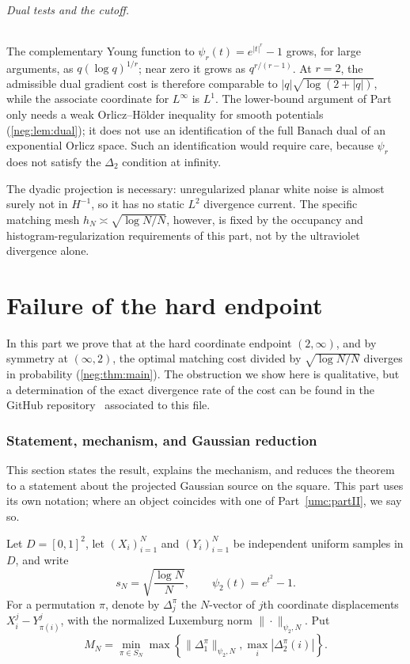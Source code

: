 \documentclass[11pt]{article}
\theoremstyle{definition}
\theoremstyle{remark}
\numberwithin{equation}{section}
\begin{document}
\paragraph{Dual tests and the cutoff.}
The complementary Young function to $\psi_r(t)=e^{|t|^r}-1$ grows,
for large arguments, as $q(\log q)^{1/r}$; near zero it grows as
$q^{r/(r-1)}$. At $r=2$, the admissible dual gradient cost is therefore
comparable to $|q|\sqrt{\log(2+|q|)}$, while the associate coordinate
for $L^\infty$ is $L^1$. The lower-bound argument of Part~\ref{umc:partIII}
only needs a weak Orlicz--H\"older inequality for smooth potentials
(\cref{neg:lem:dual}); it does not use an identification of the full
Banach dual of an exponential Orlicz space. Such an identification would
require care, because $\psi_r$ does not satisfy the $\Delta_2$ condition
at infinity.

The dyadic projection is necessary: unregularized planar white noise
is almost surely not in $H^{-1}$, so it has no static $L^2$ divergence
current. The specific matching mesh $h_N\asymp\sqrt{\log N/N}$,
however, is fixed by the occupancy and histogram-regularization
requirements of this part, not by the ultraviolet divergence alone.


\clearpage
\part{Failure of the hard endpoint}\label{umc:partIII}

In this part we prove that at the hard coordinate endpoint $(2,\infty)$,
and by symmetry at $(\infty,2)$, the optimal matching cost divided by
$\sqrt{\log N/N}$ diverges in probability (\cref{neg:thm:main}).
The obstruction we show here is qualitative, but a determination of the
exact divergence rate of the cost can be found in the GitHub
repository~\cite{umc:repository} associated to this file.

\section{Statement, mechanism, and Gaussian reduction}
\label{neg:sec:introduction}

This section states the result, explains the mechanism, and reduces
the theorem to a statement about the projected Gaussian source on the
square. This part uses its own notation; where an object
coincides with one of Part~\ref{umc:partII}, we say so.

Let $D=[0,1]^2$, let $(X_i)_{i=1}^N$ and $(Y_i)_{i=1}^N$ be
independent uniform samples in $D$, and write
\[
 s_N=\sqrt{\frac{\log N}{N}},\qquad
 \psi_2(t)=e^{t^2}-1.
\]
For a permutation $\pi$, denote by $\Delta_j^\pi$
the $N$-vector of $j$th coordinate displacements
$X_i^j-Y_{\pi(i)}^j$, with the normalized Luxemburg norm
$\|\cdot\|_{\psi_2,N}$. Put
\begin{equation}\label{neg:eq:matching-cost}
 M_N=\min_{\pi\in S_N}
 \max\left\{\|\Delta_1^\pi\|_{\psi_2,N},
              \max_i|\Delta_2^\pi(i)|\right\}.
\end{equation}
\end{document}
